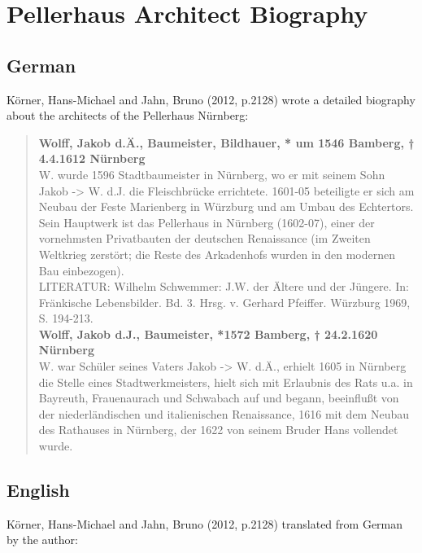 \section{Pellerhaus Architect Biography}
\label{appendix_pellerhaus_architects}

\subsection{German}

Körner, Hans-Michael and Jahn, Bruno (2012, p.2128) \parencite{bookBayerischeBiographische} wrote a detailed biography about the architects of the Pellerhaus Nürnberg:\\

\blockquote{
	
	\textbf{Wolff, Jakob d.Ä., Baumeister, Bildhauer, * um 1546 Bamberg, † 4.4.1612 Nürnberg} \\
	W. wurde 1596 Stadtbaumeister in Nürnberg, wo er mit seinem Sohn Jakob -> W. d.J. die Fleischbrücke errichtete. 1601-05 beteiligte er sich am Neubau der Feste Marienberg in Würzburg und am Umbau des Echtertors. Sein Hauptwerk ist das Pellerhaus in Nürnberg (1602-07), einer der vornehmsten Privatbauten der deutschen Renaissance (im Zweiten Weltkrieg zerstört; die Reste des Arkadenhofs wurden in den modernen Bau einbezogen).\\
	LITERATUR: Wilhelm Schwemmer: J.W. der Ältere und der Jüngere. In: Fränkische Lebensbilder. Bd. 3. Hrsg. v. Gerhard Pfeiffer. Würzburg 1969, S. 194-213.\\
	
	\textbf{Wolff, Jakob d.J., Baumeister, *1572 Bamberg, † 24.2.1620 Nürnberg} \\
	W. war Schüler seines Vaters Jakob -> W. d.Ä., erhielt 1605 in Nürnberg die Stelle eines Stadtwerkmeisters, hielt sich mit Erlaubnis des Rats u.a. in Bayreuth, Frauenaurach und Schwabach auf und begann, beeinflußt von der niederländischen und italienischen Renaissance, 1616 mit dem Neubau des Rathauses in Nürnberg, der 1622 von seinem Bruder Hans vollendet wurde. \\
	
	}

\subsection{English}

Körner, Hans-Michael and Jahn, Bruno (2012, p.2128) \parencite{bookBayerischeBiographische} translated from German by the author:


